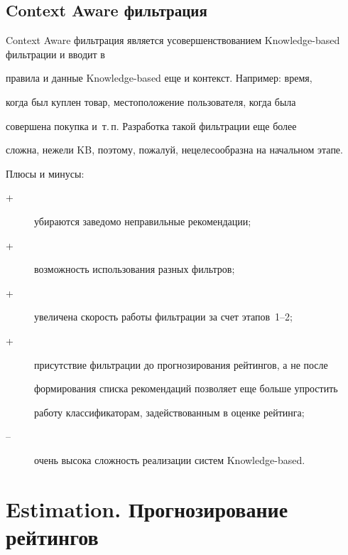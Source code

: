 \subsection{Context Aware фильтрация}





 Context Aware фильтрация является усовершенствованием Knowledge-based фильтрации и вводит в


правила и данные Knowledge-based еще и контекст. Например: время,


когда был куплен товар, местоположение пользователя, когда была


совершена покупка и~т.\,п. Разработка такой фильтрации еще более


сложна, нежели KB, поэтому, пожалуй, нецелесообразна на начальном этапе.





Плюсы и минусы:


\begin{description} %


\item[+] убираются заведомо неправильные рекомендации; 


\item[+] возможность использования разных фильтров; 


\item[+] увеличена скорость работы фильтрации за счет этапов~1--2; 


\item[+] присутствие фильтрации до прогнозирования рейтингов, а не после


формирования списка рекомендаций позволяет еще больше упростить


работу классификаторам, задействованным в оценке рейтинга;


\item[--] очень высока сложность реализации сис\-тем Knowledge-based.


\end{description}





\section{Estimation. Прогнозирование рейтингов}





